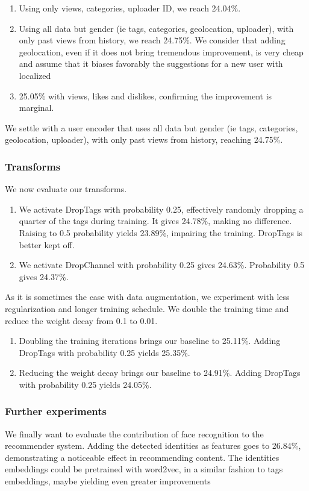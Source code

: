 \begin{enumerate}
    \item Using only views, categories, uploader ID, we reach 24.04\%.
    \item Using all data but gender (ie tags, categories, geolocation, uploader), with only past views from history, we reach 24.75\%. We consider that adding geolocation, even if it does not bring tremendous improvement, is very cheap and assume that it biases favorably the suggestions for a new user with localized 
    \item 25.05\% with views, likes and dislikes, confirming the improvement is marginal.
\end{enumerate}

We settle with a user encoder that uses all data but gender (ie tags, categories, geolocation, uploader), with only past views from history, reaching 24.75\%.

\subsubsection{Transforms}

We now evaluate our transforms.

\begin{enumerate}
    \item We activate DropTags with probability 0.25, effectively randomly dropping a quarter of the tags during training. It gives 24.78\%, making no difference. Raising to 0.5 probability yields 23.89\%, impairing the training. DropTags is better kept off.
    \item We activate DropChannel with probability 0.25 gives 24.63\%. Probability 0.5 gives 24.37\%.
\end{enumerate}

As it is sometimes the case with data augmentation, we experiment with less regularization and longer training schedule. We double the training time and reduce the weight decay from 0.1 to 0.01.

\begin{enumerate}
    \item Doubling the training iterations brings our baseline to 25.11\%. Adding DropTags with probability 0.25 yields 25.35\%.
    \item Reducing the weight decay brings our baseline to 24.91\%. Adding DropTags with probability 0.25 yields 24.05\%.
\end{enumerate}

\subsubsection{Further experiments}
We finally want to evaluate the contribution of face recognition to the recommender system. Adding the detected identities as features goes to 26.84\%, demonstrating a noticeable effect in recommending content. The identities embeddings could be pretrained with word2vec, in a similar fashion to tags embeddings, maybe yielding even greater improvements

